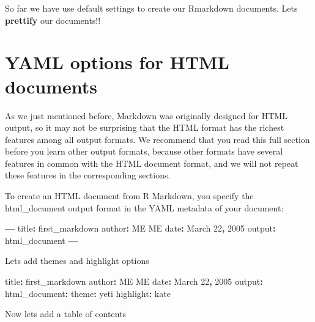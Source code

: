 \documentclass[
]{book}
\newenvironment{Shaded}{\begin{snugshade}}{\end{snugshade}}
\newcommand{\DecValTok}[1]{\textcolor[rgb]{0.00,0.00,0.81}{#1}}
\newcommand{\NormalTok}[1]{#1}
\newcommand{\OperatorTok}[1]{\textcolor[rgb]{0.81,0.36,0.00}{\textbf{#1}}}
\begin{document}
So far we have use default settings to create our Rmarkdown documents. Lets \textbf{prettify} our documents!!

\hypertarget{yaml-options-for-html-documents}{%
\section{YAML options for HTML documents}\label{yaml-options-for-html-documents}}

As we just mentioned before, Markdown was originally designed for HTML output, so it may not be surprising that the HTML format has the richest features among all output formats. We recommend that you read this full section before you learn other output formats, because other formats have several features in common with the HTML document format, and we will not repeat these features in the corresponding sections.

To create an HTML document from R Markdown, you specify the html\_document output format in the YAML metadata of your document:

\begin{Shaded}
\begin{Highlighting}[]
\OperatorTok{---}
\NormalTok{title}\OperatorTok{:}\NormalTok{ first_markdown}
\NormalTok{author}\OperatorTok{:}\NormalTok{ ME ME}
\NormalTok{date}\OperatorTok{:}\NormalTok{ March }\DecValTok{22}\OperatorTok{,} \DecValTok{2005}
\NormalTok{output}\OperatorTok{:}\NormalTok{ html_document}
\OperatorTok{---}
\end{Highlighting}
\end{Shaded}

Lets add themes and highlight options

\begin{Shaded}
\begin{Highlighting}[]
\NormalTok{title}\OperatorTok{:}\NormalTok{ first_markdown}
\NormalTok{author}\OperatorTok{:}\NormalTok{ ME ME}
\NormalTok{date}\OperatorTok{:}\NormalTok{ March }\DecValTok{22}\OperatorTok{,} \DecValTok{2005}
\NormalTok{output}\OperatorTok{:} 
\NormalTok{  html_document}\OperatorTok{:}
\NormalTok{    theme}\OperatorTok{:}\NormalTok{ yeti}
\NormalTok{    highlight}\OperatorTok{:}\NormalTok{ kate}
\end{Highlighting}
\end{Shaded}

Now lets add a table of contents
\end{document}
